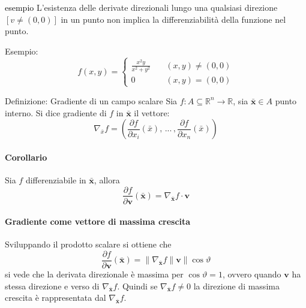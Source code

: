 \documentclass[x11names]{article}
\begin{document}
	\begin{es}{\textcolor{black}{esempio}}
		L'esistenza delle derivate direzionali lungo una qualsiasi direzione $\left[v \neq (0,0)\right]$ in un punto non implica la differenziabilità della funzione nel punto.\smallskip
		
		Esempio: 
		\[
		f(x,y) = 
		\left\{\begin{array}{ll}
			\frac{x^2 y}{x^2 + y^2} \quad   & (x,y)\neq(0,0)\\
			0 \quad                         & (x,y) = (0,0) 
		\end{array}\right.
		\]
	\end{es}
	
	\begin{center}
		\colorbox{myblue}{\begin{minipage}{5.75in}
				\begin{blues}{Definizione: Gradiente di un campo scalare}
					Sia \(f:A\subseteq \mathbb{R}^n \to \mathbb{R}\), sia \(\boldsymbol{\bar{x}} \in A\) punto interno.
					Si dice gradiente di $f$ in $\boldsymbol{\bar{x}}$ il vettore: 
					\[
					\nabla_{\bar{x}}f = \left( \frac{\partial f}{\partial x_i}(\bar{x}),\,...\,,\frac{\partial f}{\partial x_n}(\bar{x})\right) 
					\]
				\end{blues}
		\end{minipage}}       
	\end{center}
	
	
	\paragraph{Corollario} Sia \(f\) differenziabile in \(\boldsymbol{\bar{x}}\), allora
	\[ 
	\boxed{\frac{\partial f}{\partial \boldsymbol{v}}(\boldsymbol{\bar{x}}) = \nabla_{\boldsymbol{\bar{x}}}f \cdot \boldsymbol{v}}
	\]
	
	\paragraph{Gradiente come vettore di massima crescita} Sviluppando il prodotto scalare si ottiene che
	\[ 
	\frac{\partial f}{\partial \boldsymbol{v}}(\boldsymbol{\bar{x}}) =  \|\nabla_{\boldsymbol{\bar{x}}}f\|\boldsymbol{v}\|\cos\vartheta
	\]
	si vede che la derivata direzionale è massima per \(\cos\vartheta = 1\), ovvero quando \(\boldsymbol{v}\) ha stessa direzione e verso di \(\nabla_{\boldsymbol{\bar{x}}}f\). Quindi se \(\nabla_{\boldsymbol{\bar{x}}}f \neq 0\) la direzione di massima crescita è rappresentata dal \(\nabla_{\boldsymbol{\bar{x}}}f\). 
	
\end{document}
